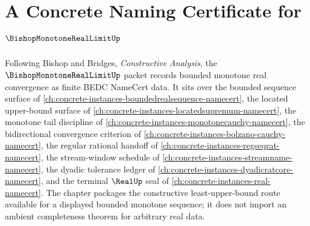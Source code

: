 \chapter{A Concrete Naming Certificate for $\BishopMonotoneRealLimitUp$}
\label{ch:concrete-instances-bishop-monotone-real-limit-namecert}

Following Bishop and Bridges, \emph{Constructive Analysis}, the $\BishopMonotoneRealLimitUp$ packet records bounded monotone real convergence as finite BEDC NameCert data. It sits over the bounded sequence surface of \autoref{ch:concrete-instances-boundedrealsequence-namecert}, the located upper-bound surface of \autoref{ch:concrete-instances-locatedsupremum-namecert}, the monotone tail discipline of \autoref{ch:concrete-instances-monotonecauchy-namecert}, the bidirectional convergence criterion of \autoref{ch:concrete-instances-bolzano-cauchy-namecert}, the regular rational handoff of \autoref{ch:concrete-instances-regseqrat-namecert}, the stream-window schedule of \autoref{ch:concrete-instances-streamname-namecert}, the dyadic tolerance ledger of \autoref{ch:concrete-instances-dyadicratcore-namecert}, and the terminal $\RealUp$ seal of \autoref{ch:concrete-instances-real-namecert}. The chapter packages the constructive least-upper-bound route available for a displayed bounded monotone sequence; it does not import an ambient completeness theorem for arbitrary real data.

